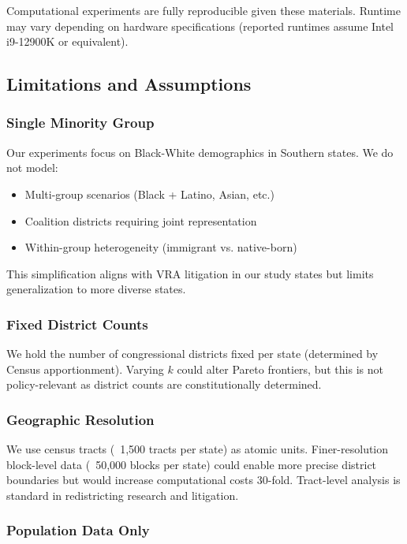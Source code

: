 Computational experiments are fully reproducible given these materials. Runtime may vary depending on hardware specifications (reported runtimes assume Intel i9-12900K or equivalent).

\subsection{Limitations and Assumptions}

\subsubsection{Single Minority Group}

Our experiments focus on Black-White demographics in Southern states. We do not model:
\begin{itemize}
    \item Multi-group scenarios (Black + Latino, Asian, etc.)
    \item Coalition districts requiring joint representation
    \item Within-group heterogeneity (immigrant vs. native-born)
\end{itemize}

This simplification aligns with VRA litigation in our study states but limits generalization to more diverse states.

\subsubsection{Fixed District Counts}

We hold the number of congressional districts fixed per state (determined by Census apportionment). Varying $k$ could alter Pareto frontiers, but this is not policy-relevant as district counts are constitutionally determined.

\subsubsection{Geographic Resolution}

We use census tracts (~1,500 tracts per state) as atomic units. Finer-resolution block-level data (~50,000 blocks per state) could enable more precise district boundaries but would increase computational costs 30-fold. Tract-level analysis is standard in redistricting research and litigation.

\subsubsection{Population Data Only}

